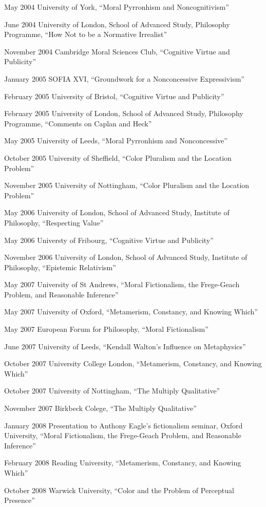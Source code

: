 \documentclass[contbibnum]{cv}
\begin{document}
\begin{topic}
    \item[May 2004] University of York, ``Moral Pyrronhism and Noncognitivism''
    \item[June 2004] University of London, School of Advanced Study, Philosophy Programme, ``How Not to be a Normative Irrealist''
    \item[November 2004] Cambridge Moral Sciences Club, ``Cognitive Virtue and Publicity''
    \item[January 2005] SOFIA XVI, ``Groundwork for a Nonconcessive Expressivism''
    \item[February 2005] University of Bristol, ``Cognitive Virtue and Publicity''
    \item[February 2005] University of London, School of Advanced Study, Philosophy Programme, ``Comments on Caplan and Heck''
    \item[May 2005] University of Leeds, ``Moral Pyrronhism and Nonconcessive''
    \item[October 2005] University of Sheffield, ``Color Pluralism and the Location Problem''
    \item[November 2005] University of Nottingham, ``Color Pluralism and the Location Problem''
    \item[May 2006] University of London, School of Advanced Study, Institute of Philosophy, ``Respecting Value''
    \item[May 2006] Universty of Fribourg, ``Cognitive Virtue and Publicity''
    \item[November 2006] University of London, School of Advanced Study, Institute of Philosophy, ``Epistemic Relativism''
    \item[May 2007] University of St Andrews, ``Moral Fictionalism, the Frege-Geach Problem, and Reasonable Inference''
    \item[May 2007] University of Oxford, ``Metamerism, Constancy, and Knowing Which''
    \item[May 2007] European Forum for Philosophy, ``Moral Fictionalism''
    \item[June 2007] University of Leeds, ``Kendall Walton's Influence on Metaphysics''
    \item [October 2007] University College London, ``Metamerism, Constancy, and Knowing Which''
    \item[October 2007] University of Nottingham, ``The Multiply Qualitative''
    \item[November 2007] Birkbeck Colege, ``The Multiply Qualitative''
    \item[January 2008] Presentation to Anthony Eagle's fictionalism seminar, Oxford University, ``Moral Fictionalism, the Frege-Geach Problem, and Reasonable Inference''
    \item[February 2008] Reading University, ``Metamerism, Constancy, and Knowing Which''
    \item[October 2008] Warwick University, ``Color and the Problem of Perceptual Presence''
\end{topic}
\end{document}

